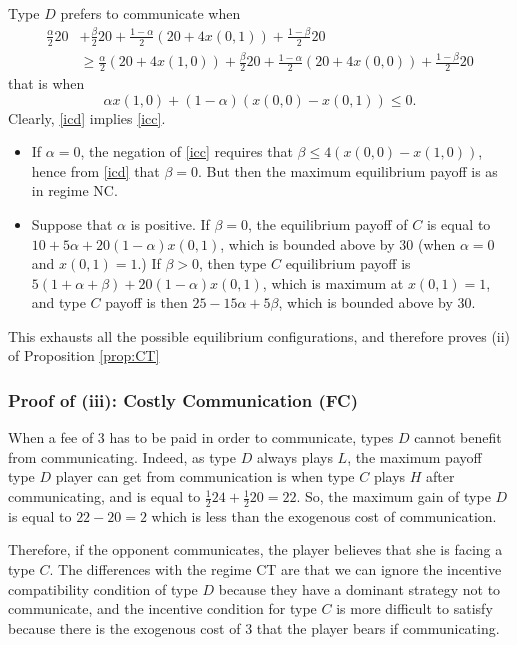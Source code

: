 \documentclass[12pt]{article}
\theoremstyle{break}
\begin{document}
\begin{enumerate}[(a)]
\begin{equation}
\end{equation}
%
Type $D$ prefers to communicate when
%
\begin{align*}
	\frac{\alpha}{2}20&+\frac{\beta}{2}20+\frac{1-\alpha}{2}(20+4x(0,1))+\frac{1-\beta}{2}20\\ 
	&\geq \frac{\alpha}{2}(20+4x(1,0))+\frac{\beta}{2}20+\frac{1-\alpha}{2}(20+4x(0,0))+\frac{1-\beta}{2}20
\end{align*}
%
that is when%
\begin{equation}\label{icd}
	\alpha x(1,0)+(1-\alpha)(x(0,0)-x(0,1))\leq 0.
\end{equation}
%
Clearly, \eqref{icd} implies \eqref{icc}. 
\begin{itemize}
	\item If $\alpha=0$, the negation of \eqref{icc} requires that $\beta\leq 4(x(0,0)-x(1,0))$, hence from \eqref{icd} that $\beta=0$. But then the maximum equilibrium payoff is as in regime NC.
	\item  Suppose that $\alpha$ is positive. If $\beta=0$, the equilibrium payoff of $C$ is equal to $10+5\alpha+20(1-\alpha)x(0,1)$, which is bounded above by $30$ (when $\alpha=0$ and $x(0,1)=1$.) If $\beta>0$, then type $C$ equilibrium payoff is $5(1+\alpha+\beta)+20(1-\alpha)x(0,1)$, which is maximum at $x(0,1)=1$, and type $C$ payoff is then $25-15\alpha+5\beta$, which is bounded above by $30$.
\end{itemize}

\end{enumerate}

This exhausts all the possible equilibrium configurations, and therefore proves (ii) of Proposition \ref{prop:CT}


\subsubsection*{Proof of (iii): Costly Communication (FC)}
When a fee of $3$ has to be paid in order to communicate, types $D$ cannot benefit from communicating. Indeed, as type $D$ always plays $L$, the maximum payoff type $D$ player can get from communication is when type $C$ plays $H$ after communicating, and is equal to $\frac{1}{2}24 +\frac{1}{2}20=22$. So, the maximum gain of type $D$ is equal to $22-20=2$ which is less than the exogenous cost of communication.

Therefore, if the opponent communicates, the player believes that she is facing a type $C$. The differences with the regime CT are that we can ignore the incentive compatibility condition of type $D$ because they have a dominant strategy not to communicate, and the incentive condition for type $C$ is more difficult to satisfy because there is the exogenous cost of $3$ that the player bears if communicating.  
\end{document}
